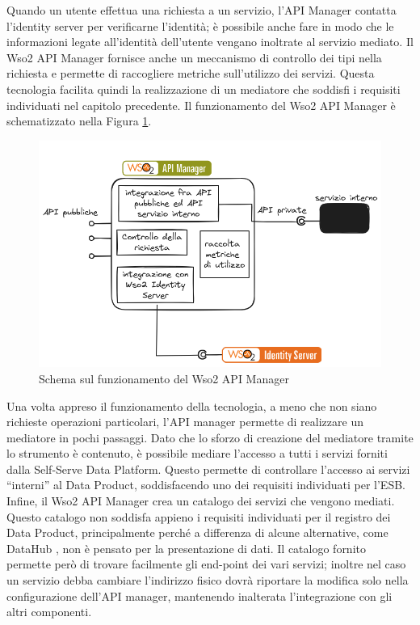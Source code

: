 \documentclass[12pt]{report}
\begin{document}
Quando un utente effettua una richiesta a un servizio, l'API Manager contatta l'identity server per verificarne l'identità; è possibile anche fare in modo che le informazioni legate all'identità dell'utente vengano inoltrate al servizio mediato.
Il Wso2 API Manager fornisce anche un meccanismo di controllo dei tipi nella richiesta e permette di raccogliere metriche sull'utilizzo dei servizi. 
Questa tecnologia facilita quindi la realizzazione di un mediatore che soddisfi i requisiti individuati nel capitolo precedente.
Il funzionamento del Wso2 API Manager è schematizzato nella Figura \ref{funzionamento_api_manager}.
\begin{figure}[H]
    \centering
    \includegraphics[width=\linewidth]{immagini/wso2 apim schema.png}
    \caption{Schema sul funzionamento del Wso2 API Manager}
    \label{funzionamento_api_manager}
\end{figure}
Una volta appreso il funzionamento della tecnologia, a meno che non siano richieste operazioni particolari, l'API manager permette di realizzare un mediatore in pochi passaggi.
Dato che lo sforzo di creazione del mediatore tramite lo strumento è contenuto, è possibile mediare l'accesso a tutti i servizi forniti dalla Self-Serve Data Platform.
Questo permette di controllare l'accesso ai servizi ``interni'' al Data Product, soddisfacendo uno dei requisiti individuati per l'ESB.
Infine, il Wso2 API Manager crea un catalogo dei servizi che vengono mediati. 
Questo catalogo non soddisfa appieno i requisiti individuati per il registro dei Data Product, principalmente perché a differenza di alcune alternative, come DataHub \cite{dataHub}, non è pensato per la presentazione di dati.
Il catalogo fornito permette però di trovare facilmente gli end-point dei vari servizi; inoltre nel caso un servizio debba cambiare l'indirizzo fisico dovrà riportare la modifica solo nella configurazione dell'API manager, mantenendo inalterata l'integrazione con gli altri componenti.
\end{document}
